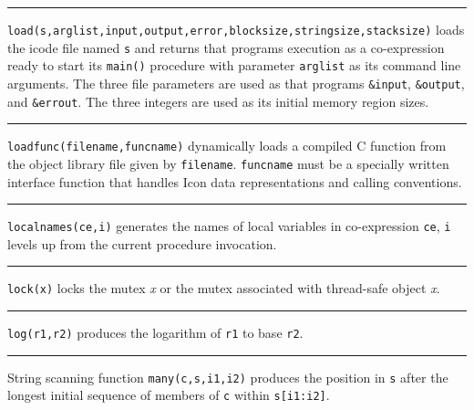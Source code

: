 \bigskip\hrule\vspace{0.1cm}

\noindent
{}\texttt{load(s,arglist,input,output,error,blocksize,stringsize,stacksize)}
loads the icode file named \texttt{s} and returns that
program{\textquotesingle}s execution as a co-expression ready to start
its \texttt{main()} procedure with parameter \texttt{arglist} as its
command line arguments. The three file parameters are used as that
program{\textquotesingle}s \texttt{\&input}, \texttt{\&output}, and
\texttt{\&errout}. The three integers are used as its initial memory
region sizes.

\bigskip\hrule\vspace{0.1cm}

\noindent
{}\texttt{loadfunc(filename,funcname)} dynamically
loads a compiled C function from the object library file given by
\texttt{filename}. \texttt{funcname} must be a specially written
interface function that handles Icon data representations and calling
conventions.

\bigskip\hrule\vspace{0.1cm}

\noindent
{}\texttt{localnames(ce,i)} generates the
names of local variables in co-expression \texttt{ce}, \texttt{i}
levels up from the current procedure invocation.

\bigskip\hrule\vspace{0.1cm}

\noindent
{}\texttt{lock(x)} locks the mutex {\textit x} or the mutex
associated with thread-safe object {\textit x}.

\bigskip\hrule\vspace{0.1cm}

\noindent
{}\texttt{log(r1,r2)} produces the logarithm of
\texttt{r1} to base \texttt{r2}.

\bigskip\hrule\vspace{0.1cm}

\noindent
{}String scanning function \texttt{many(c,s,i1,i2)} produces
the position in \texttt{s} after the longest initial sequence of
members of \texttt{c} within \texttt{s[i1:i2]}.


